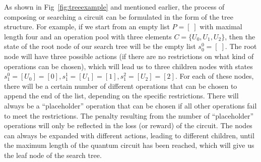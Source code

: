 \documentclass{ieeeaccess}
\begin{document}
  As shown in Fig~\ref{fig:treeexample} and mentioned earlier, the process of composing or searching a circuit can be formulated in the form of the tree structure. For example, if we start from an empty list $P = [\;]$ with maximal length four and an operation pool with three elements $C = \{U_0, U_1, U_2\}$, 
  then the state of the root node of our search tree will be the empty list $s_0^0 = [\;]$. The root node will have three possible actions (if there are no restrictions on what kind of operations can be chosen), which will lead us to three children nodes with states $s_1^0 = [U_0]=[0], s_1^1 = [U_1]=[1], s_1^2=[U_2] = [2]$. For each of these nodes, there will be a certain number of different operations that can be chosen to append the end of the list, depending on the specific restrictions. There will always be a ``placeholder'' operation that can be chosen if all other operations fail to meet the restrictions. The penalty resulting from the number of ``placeholder'' operations will only be reflected in the loss (or reward) of the circuit. The nodes can always be expanded with different actions, leading to different children, until the maximum length of the quantum circuit has been reached, which will give us the leaf node of the search tree. 
  
\end{document}
